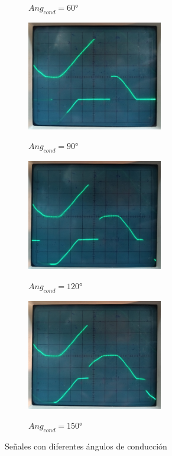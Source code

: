 \begin{figure}[H]
\begin{center}
\begin{subfigure}[b]{0.5\textwidth}
        \label{}
        \caption{$Ang_{cond}=60$°}
    \end{subfigure}
    \hfill
        \begin{subfigure}[b]{0.49\textwidth}
        \centering  
            \includegraphics[width=0.65\textwidth]{Imagenes/90grad.jpeg}
        \label{}
        \caption{$Ang_{cond}=90$°}
    \end{subfigure}
    \hfill
        \begin{subfigure}[b]{0.5\textwidth}
        \centering  
            \includegraphics[width=0.65\textwidth]{Imagenes/120grad.jpeg}
        \label{}
        \caption{$Ang_{cond}=120$°}
    \end{subfigure}
    \hfill
        \begin{subfigure}[b]{0.49\textwidth}
        \centering  
            \includegraphics[width=0.65\textwidth]{Imagenes/150grad.jpeg}
        \label{}
        \caption{$Ang_{cond}=150$°}
    \end{subfigure}
    \caption{Señales con diferentes ángulos de conducción}
    \label{fig:fot_exp4}
    \end{center}
\end{figure}
